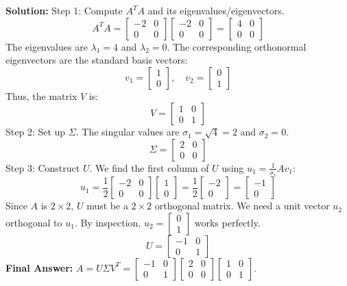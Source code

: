 \documentclass[11pt, letterpaper]{article}
\theoremstyle{definition}
\theoremstyle{remark}
\begin{document}
\textbf{Solution:}
Step 1: Compute $A^TA$ and its eigenvalues/eigenvectors.
\[
A^TA = \begin{bmatrix} -2 & 0 \\ 0 & 0 \end{bmatrix} \begin{bmatrix} -2 & 0 \\ 0 & 0 \end{bmatrix} = \begin{bmatrix} 4 & 0 \\ 0 & 0 \end{bmatrix}
\]
The eigenvalues are $\lambda_1 = 4$ and $\lambda_2 = 0$. The corresponding orthonormal eigenvectors are the standard basis vectors:
\[
v_1 = \begin{bmatrix} 1 \\ 0 \end{bmatrix}, \quad v_2 = \begin{bmatrix} 0 \\ 1 \end{bmatrix}
\]
Thus, the matrix $V$ is:
\[
V = \begin{bmatrix} 1 & 0 \\ 0 & 1 \end{bmatrix}
\]
Step 2: Set up $\Sigma$.
The singular values are $\sigma_1 = \sqrt{4} = 2$ and $\sigma_2 = 0$.
\[
\Sigma = \begin{bmatrix} 2 & 0 \\ 0 & 0 \end{bmatrix}
\]
Step 3: Construct $U$.
We find the first column of $U$ using $u_1 = \frac{1}{\sigma_1} A v_1$:
\[
u_1 = \frac{1}{2} \begin{bmatrix} -2 & 0 \\ 0 & 0 \end{bmatrix} \begin{bmatrix} 1 \\ 0 \end{bmatrix} = \frac{1}{2} \begin{bmatrix} -2 \\ 0 \end{bmatrix} = \begin{bmatrix} -1 \\ 0 \end{bmatrix}
\]
Since $A$ is $2 \times 2$, $U$ must be a $2 \times 2$ orthogonal matrix. We need a unit vector $u_2$ orthogonal to $u_1$. By inspection, $u_2 = \begin{bmatrix} 0 \\ 1 \end{bmatrix}$ works perfectly.
\[
U = \begin{bmatrix} -1 & 0 \\ 0 & 1 \end{bmatrix}
\]
\textbf{Final Answer:} $A = U \Sigma V^T = \begin{bmatrix} -1 & 0 \\ 0 & 1 \end{bmatrix} \begin{bmatrix} 2 & 0 \\ 0 & 0 \end{bmatrix} \begin{bmatrix} 1 & 0 \\ 0 & 1 \end{bmatrix}$.
\end{document}
